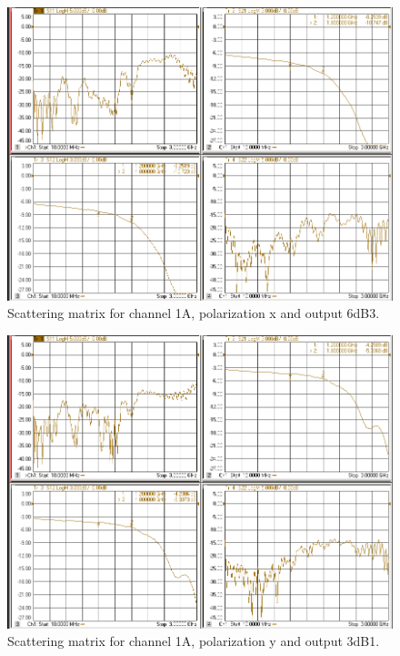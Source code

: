\documentclass[12pt,a4paper,oneside]{article}
\begin{document}
\begin{figure}[H]
\centering
\includegraphics[width=0.9\linewidth]{VNA_results/1Ax_6dB3.png}
\caption{Scattering matrix for channel 1A, polarization x and output 6dB3.}
\label{fig:1Ax_6dB3}
\end{figure}


\begin{figure}[H]
\centering
\includegraphics[width=0.9\linewidth]{VNA_results/1Ay_3dB1.png}
\caption{Scattering matrix for channel 1A, polarization y and output 3dB1.}
\label{fig:1Ay_3dB1}
\end{figure}
\end{document}
